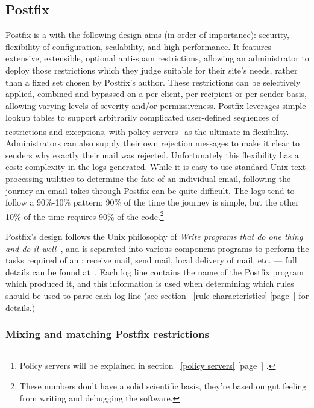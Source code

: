 \documentclass[a4paper,12pt,draft]{article}
\newcommand{\refwithpage}[1]{%
    \empty{}\ref{#1} [page~\pageref{#1}]%
}
\begin{document}
\subsection{Postfix}

\label{postfix background}

Postfix is a \MTA{} with the following design aims (in order of
importance): security, flexibility of configuration, scalability, and high
performance.  It features extensive, extensible, optional anti-spam
restrictions, allowing an administrator to deploy those restrictions which
they judge suitable for their site's needs, rather than a fixed set chosen
by Postfix's author.  These restrictions can be selectively applied,
combined and bypassed on a per-client, per-recipient or per-sender basis,
allowing varying levels of severity and/or permissiveness.  Postfix
leverages simple lookup tables to support arbitrarily complicated
user-defined sequences of restrictions and exceptions, with policy
servers\footnote{Policy servers will be explained in
section~\refwithpage{policy servers}.} as the ultimate in flexibility.
Administrators can also supply their own rejection messages to make it
clear to senders why exactly their mail was rejected.  Unfortunately this
flexibility has a cost: complexity in the logs generated.  While it is easy
to use standard Unix text processing utilities to determine the fate of an
individual email, following the journey an email takes through Postfix can
be quite difficult.  The logs tend to follow a 90\%-10\% pattern: 90\% of
the time the journey is simple, but the other 10\% of the time requires
90\% of the code.\footnote{These numbers don't have a solid scientific
basis, they're based on gut feeling from writing and debugging the
software.}

Postfix's design follows the Unix philosophy of \textit{Write programs that
do one thing and do it well\/}~\cite{unix-philosophy}, and is separated
into various component programs to perform the tasks required of an
\MTA{}\@: receive mail, send mail, local delivery of mail, etc. --- full
details can be found at~\cite{postfix-overview}.  Each log line contains
the name of the Postfix program which produced it, and this information is
used when determining which rules should be used to parse each log line
(see section~\refwithpage{rule characteristics} for details.)

\subsubsection{Mixing and matching Postfix restrictions}
\end{document}
